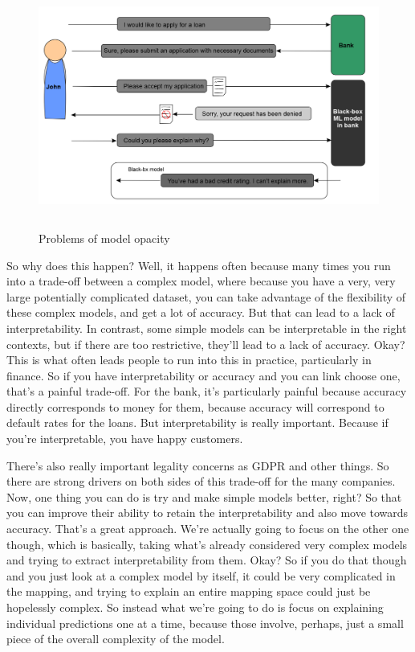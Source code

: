 \begin{figure}[h]
	\centering
	\includegraphics[width=0.9\linewidth,height=80mm]{images/loan.png}
	\caption{Problems of model opacity}
    \label{fig:model_bbm}
    \vspace{-2mm}
\end{figure}

\hspace*{3.5mm} So why does this happen? Well, it happens often because many times you run into a trade-off between a complex model, where because you have a very, very large potentially complicated dataset, you can take advantage of the flexibility of these complex models, and get a lot of accuracy. But that can lead to a lack of interpretability. In contrast, some simple models can be interpretable in the right contexts, but if there are too restrictive, they'll lead to a lack of accuracy.
Okay? This is what often leads people to run into this in practice, particularly in finance. So if you have interpretability or accuracy and you can link choose one, that's a painful trade-off. For the bank, it's particularly painful because accuracy directly corresponds to money for them, because accuracy will correspond to default rates for the loans. But interpretability is really important. Because if you're interpretable, you have happy customers.

\hspace*{3.5mm} There's also really important legality concerns as GDPR and other things. So there are strong drivers on both sides of this trade-off for the many companies. Now, one thing you can do is try and make simple models better, right? So that you can improve their ability to retain the interpretability and also move towards accuracy. That's a great approach. We're actually going to focus on the other one though, which is basically, taking what's already considered very complex models and trying to extract interpretability from them. Okay? So if you do that though and you just look at a complex model by itself, it could be very complicated in the mapping, and trying to explain an entire mapping space could just be hopelessly complex. So instead what we're going to do is focus on explaining individual predictions one at a time, because those involve, perhaps, just a small piece of the overall complexity of the model. 

